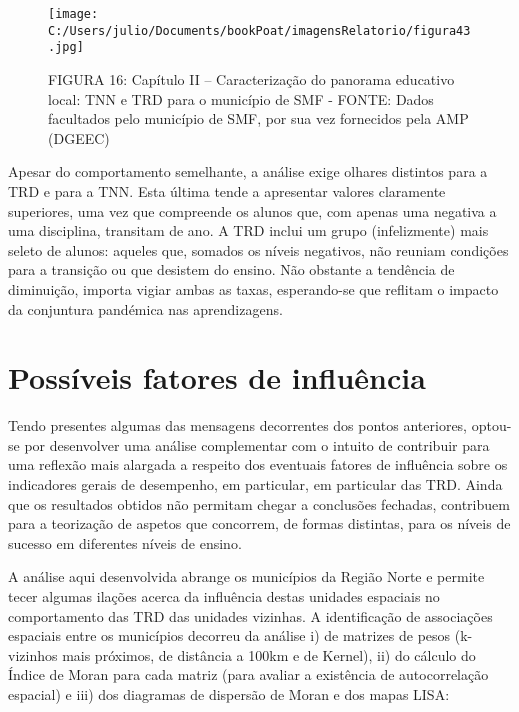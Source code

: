 \documentclass[
]{book}
\begin{document}
\begin{figure}
\centering
\texttt{[image: C:/Users/julio/Documents/bookPoat/imagensRelatorio/figura43.jpg]}
\caption{FIGURA 16: Capítulo II -- Caracterização do panorama educativo local: TNN e TRD para o município de SMF - FONTE: Dados facultados pelo município de SMF, por sua vez fornecidos pela AMP (DGEEC)}
\end{figure}

Apesar do comportamento semelhante, a análise exige olhares distintos para a TRD e para a TNN. Esta última tende a apresentar valores claramente superiores, uma vez que compreende os alunos que, com apenas uma negativa a uma disciplina, transitam de ano. A TRD inclui um grupo (infelizmente) mais seleto de alunos: aqueles que, somados os níveis negativos, não reuniam condições para a transição ou que desistem do ensino. Não obstante a tendência de diminuição, importa vigiar ambas as taxas, esperando-se que reflitam o impacto da conjuntura pandémica nas aprendizagens.

\hypertarget{possuxedveis-fatores-de-influuxeancia}{%
\section{\texorpdfstring{\textbf{Possíveis fatores de influência}}{Possíveis fatores de influência}}\label{possuxedveis-fatores-de-influuxeancia}}

Tendo presentes algumas das mensagens decorrentes dos pontos anteriores, optou-se por desenvolver uma análise complementar com o intuito de contribuir para uma reflexão mais alargada a respeito dos eventuais fatores de influência sobre os indicadores gerais de desempenho, em particular, em particular das TRD. Ainda que os resultados obtidos não permitam chegar a conclusões fechadas, contribuem para a teorização de aspetos que concorrem, de formas distintas, para os níveis de sucesso em diferentes níveis de ensino.

A análise aqui desenvolvida abrange os municípios da Região Norte e permite tecer algumas ilações acerca da influência destas unidades espaciais no comportamento das TRD das unidades vizinhas. A identificação de associações espaciais entre os municípios decorreu da análise i) de matrizes de pesos (k-vizinhos mais próximos, de distância a 100km e de Kernel), ii) do cálculo do Índice de Moran para cada matriz (para avaliar a existência de autocorrelação espacial) e iii) dos diagramas de dispersão de Moran e dos mapas LISA:
\end{document}
